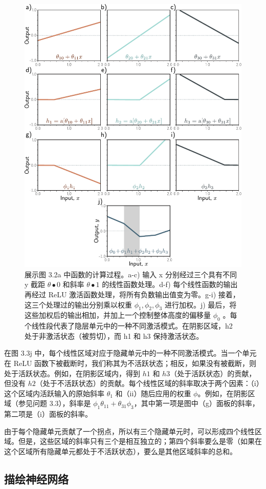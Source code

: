 \documentclass[lang=cn,newtx,10pt,scheme=chinese]{elegantbook}
\begin{document}
\begin{figure}[ht!]
	\centering
	\includegraphics[width=0.7\linewidth]{PDFFigures/UDLChap3PDF/ShallowBuildUp.pdf}
\caption{展示图 3.2a 中函数的计算过程。a-c) 输入 x 分别经过三个具有不同 y 截距 \(\theta•0\) 和斜率 \(\theta•1\) 的线性函数处理。d-f) 每个线性函数的输出再经过 ReLU 激活函数处理，将所有负数输出值变为零。g-i) 接着，这三个处理过的输出分别乘以权重 \(\phi_1 , \phi_2 , \phi_3\) 进行加权。j) 最后，将这些加权后的输出相加，并加上一个控制整体高度的偏移量 \(\phi_0\) 。每个线性段代表了隐层单元中的一种不同激活模式。在阴影区域，h2 处于非激活状态（被剪切），而 h1 和 h3 保持激活状态。}
\end{figure}

在图 3.3j 中，每个线性区域对应于隐藏单元中的一种不同激活模式。当一个单元在 ReLU 函数下被截断时，我们称其为不活跃状态；相反，如果没有被截断，则处于活跃状态。例如，在阴影区域内，得到 \(h1\) 和 \(h3\)（处于活跃状态）的贡献，但没有 \(h2\)（处于不活跃状态）的贡献。每个线性区域的斜率取决于两个因素：（i）这个区域内活跃输入的原始斜率 \(\theta_1\) 和（ii）随后应用的权重 \(\phi\)。例如，在阴影区域（参见问题 3.3），斜率是 \(\phi_1\theta_{11} + \theta_{31}\phi_3\)，其中第一项是图中（g）面板的斜率，第二项是（i）面板的斜率。

由于每个隐藏单元贡献了一个拐点，所以有三个隐藏单元时，可以形成四个线性区域。但是，这些区域的斜率只有三个是相互独立的；第四个斜率要么是零（如果在这个区域所有隐藏单元都处于不活跃状态），要么是其他区域斜率的总和。

\subsection{描绘神经网络}
\end{document}
